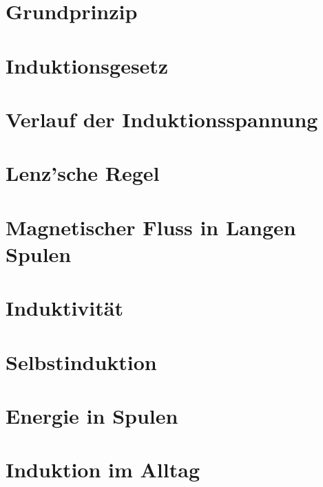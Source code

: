\section{Grundprinzip}




\section{Induktionsgesetz}




\section{Verlauf der Induktionsspannung}




\section{Lenz'sche Regel}

 \label{sec:Lenz}


\section[Lange Spulen]{Magnetischer Fluss in Langen Spulen}




\section{Induktivität}




\section{Selbstinduktion}




\section{Energie in Spulen}								\label{sec:EnergieSpule}




\section{Induktion im Alltag}							\label{sec:Alltag}

